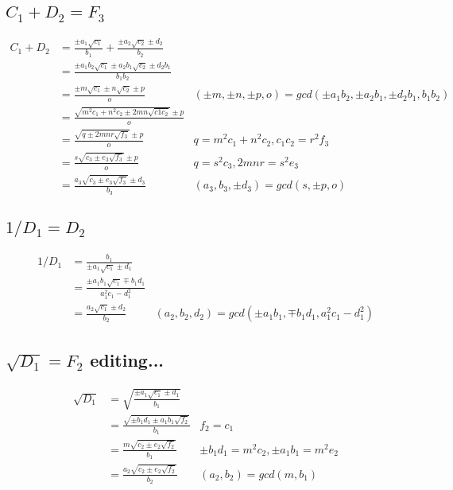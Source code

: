 \documentclass{article}
\begin{document}
\subsection{$C_1 + D_2 = F_3$}
\begin{align*}
C_1 + D_2 &= \frac{\pm a_1\sqrt{c_1}}{b_1} + \frac{\pm a_2\sqrt{c_2} \pm d_2 }{b_2}\\
 &= \frac{\pm a_1b_2\sqrt{c_1} \pm a_2b_1\sqrt{c_2} \pm d_2b_1}{b_1b_2} \\
 &= \frac{\pm m\sqrt{c_1} \pm n\sqrt{c_2} \pm p}{o} 
 & (\pm m, \pm n, \pm p, o) = gcd(\pm a_1b_2, \pm a_2b_1, \pm d_2b_1, b_1b_2)\\
 &= \frac{\sqrt{m^2c_1 + n^2c_2 \pm 2mn\sqrt{c1c_2}} \pm p }{o} \\
 &= \frac{\sqrt{q \pm 2mnr\sqrt{f_3}} \pm p}{o}     & q = m^2c_1 + n^2c_2, c_1c_2 = r^2f_3\\
 &= \frac{s\sqrt{c_3 \pm e_3\sqrt{f_3}} \pm p}{o}   & q = s^2c_3, 2mnr = s^2e_3 \\
 &= \frac{a_3\sqrt{c_3 \pm e_3\sqrt{f_3}} \pm d_3}{b_3}
    & (a_3, b_3, \pm d_3) = gcd(s, \pm p, o)
\end{align*}

\subsection{$1 / D_1 = D_2$}
\begin{align*}
1 / D_1 &= \frac{b_1}{\pm a_1\sqrt{c_1} \pm d_1 }\\
 &= \frac{\pm a_1b_1\sqrt{c_1} \mp b_1d_1 }{a_1^2c_1 - d_1^2}\\
 &= \frac{a_2\sqrt{c_1} \pm d_2}{b_2}
    & (a_2, b_2, d_2) = gcd(\pm a_1b_1, \mp b_1d_1, a_1^2c_1 - d_1^2)
\end{align*}

\subsection{$\sqrt{D_1} = F_2$ editing...}
\begin{align*}
\sqrt{D_1} &= \sqrt{\frac{\pm a_1\sqrt{c_1} \pm d_1 }{b_1}}\\
 &= \frac{\sqrt{\pm b_1d_1 \pm a_1b_1\sqrt{f_2}}}{b_1}
    & f_2 = c_1\\
 &= \frac{m\sqrt{c_2 \pm e_2\sqrt{f_2}}}{b_1}
    & \pm b_1d_1 = m^2c_2, \pm a_1b_1 = m^2e_2\\
 &= \frac{a_2\sqrt{c_2 \pm e_2\sqrt{f_2}}}{b_2}
    & (a_2, b_2) = gcd(m, b_1)
\end{align*}
\end{document}
